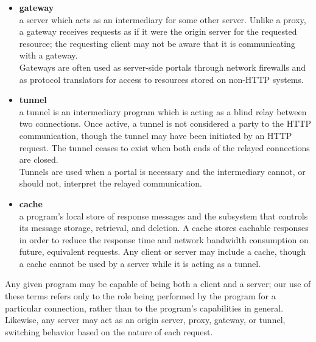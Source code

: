 \begin{itemize}
{Proxies are often used as client-side portals
through network firewalls and as helper applications for handling requests via protocols not implemented by the user agent.}
\item{\textbf{gateway}\\
a server which acts as an intermediary for some other server. Unlike a proxy, a gateway receives requests as if it were the origin server for the requested resource; the requesting client may not be aware that it is communicating with a gateway.\\
Gateways are often used as server-side portals through network firewalls and as protocol translators for access to resources stored on non-HTTP systems.}
\item{\textbf{tunnel}\\
a tunnel is an intermediary program which is acting as a blind relay between two connections. Once active, a tunnel is not considered a party to the HTTP communication, though the tunnel may have been initiated by an HTTP request. The tunnel ceases to exist when both ends of the relayed connections are closed.\\
Tunnels are used when a portal is necessary and the intermediary cannot, or should not, interpret the relayed communication.}
\item{\textbf{cache}\\
a program's local store of response messages and the subsystem that controls its message storage, retrieval, and deletion. A cache stores cachable responses in order to reduce the response time and network bandwidth consumption on future, equivalent requests. Any client or server may include a cache, though a cache cannot be used by a server while it is acting as a tunnel.}
\end{itemize}
Any given program may be capable of being both a client and a server; our use of these terms refers only to the role being performed by the program for a particular connection, rather than to the program's capabilities in general. Likewise, any server may act as an origin server, proxy, gateway, or tunnel, switching behavior based on the nature of each request.

